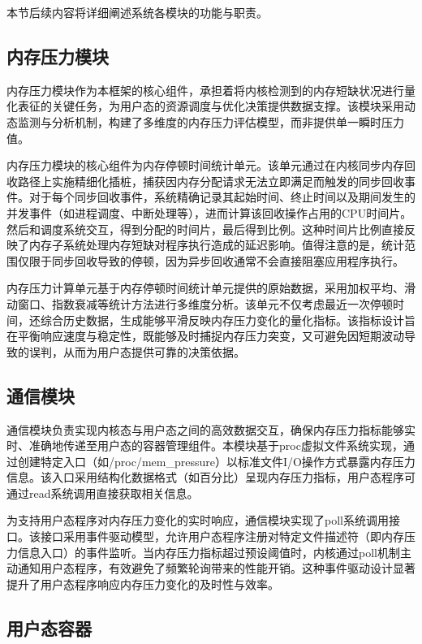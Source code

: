 本节后续内容将详细阐述系统各模块的功能与职责。


\subsection{内存压力模块}

内存压力模块作为本框架的核心组件，承担着将内核检测到的内存短缺状况进行量化表征的关键任务，为用户态的资源调度与优化决策提供数据支撑。该模块采用动态监测与分析机制，构建了多维度的内存压力评估模型，而非提供单一瞬时压力值。

内存压力模块的核心组件为内存停顿时间统计单元。该单元通过在内核同步内存回收路径上实施精细化插桩，捕获因内存分配请求无法立即满足而触发的同步回收事件。对于每个同步回收事件，系统精确记录其起始时间、终止时间以及期间发生的并发事件（如进程调度、中断处理等），进而计算该回收操作占用的CPU时间片。然后和调度系统交互，得到分配的时间片，最后得到比例。这种时间片比例直接反映了内存子系统处理内存短缺对程序执行造成的延迟影响。值得注意的是，统计范围仅限于同步回收导致的停顿，因为异步回收通常不会直接阻塞应用程序执行。

内存压力计算单元基于内存停顿时间统计单元提供的原始数据，采用加权平均、滑动窗口、指数衰减等统计方法进行多维度分析。该单元不仅考虑最近一次停顿时间，还综合历史数据，生成能够平滑反映内存压力变化的量化指标。该指标设计旨在平衡响应速度与稳定性，既能够及时捕捉内存压力突变，又可避免因短期波动导致的误判，从而为用户态提供可靠的决策依据。

\subsection{通信模块}

通信模块负责实现内核态与用户态之间的高效数据交互，确保内存压力指标能够实时、准确地传递至用户态的容器管理组件。本模块基于proc虚拟文件系统实现，通过创建特定入口（如/proc/mem\_pressure）以标准文件I/O操作方式暴露内存压力信息。该入口采用结构化数据格式（如百分比）呈现内存压力指标，用户态程序可通过read系统调用直接获取相关信息。

为支持用户态程序对内存压力变化的实时响应，通信模块实现了poll系统调用接口。该接口采用事件驱动模型，允许用户态程序注册对特定文件描述符（即内存压力信息入口）的事件监听。当内存压力指标超过预设阈值时，内核通过poll机制主动通知用户态程序，有效避免了频繁轮询带来的性能开销。这种事件驱动设计显著提升了用户态程序响应内存压力变化的及时性与效率。

\subsection{用户态容器}

